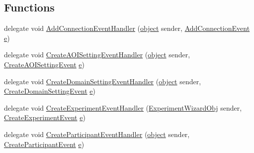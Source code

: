 \subsection*{Functions}
\begin{DoxyCompactItemize}
\item 
delegate void \hyperlink{namespace_web_analyzer_1_1_events_a902fba3fe7d4503704b73171cd38cf68}{Add\+Connection\+Event\+Handler} (\hyperlink{_u_i_2_h_t_m_l_resources_2js_2lib_2underscore_8min_8js_aae18b7515bb2bc4137586506e7c0c903}{object} sender, \hyperlink{class_web_analyzer_1_1_events_1_1_add_connection_event}{Add\+Connection\+Event} \hyperlink{_u_i_2_h_t_m_l_resources_2js_2lib_2bootstrap_8min_8js_ab5902775854a8b8440bcd25e0fe1c120}{e})
\item 
delegate void \hyperlink{namespace_web_analyzer_1_1_events_a1da12d77ad447a64e9f63c4ce04040ff}{Create\+A\+O\+I\+Setting\+Event\+Handler} (\hyperlink{_u_i_2_h_t_m_l_resources_2js_2lib_2underscore_8min_8js_aae18b7515bb2bc4137586506e7c0c903}{object} sender, \hyperlink{class_web_analyzer_1_1_events_1_1_create_a_o_i_setting_event}{Create\+A\+O\+I\+Setting\+Event} \hyperlink{_u_i_2_h_t_m_l_resources_2js_2lib_2bootstrap_8min_8js_ab5902775854a8b8440bcd25e0fe1c120}{e})
\item 
delegate void \hyperlink{namespace_web_analyzer_1_1_events_a51e3882127acccb363a75b247db1d884}{Create\+Domain\+Setting\+Event\+Handler} (\hyperlink{_u_i_2_h_t_m_l_resources_2js_2lib_2underscore_8min_8js_aae18b7515bb2bc4137586506e7c0c903}{object} sender, \hyperlink{class_web_analyzer_1_1_events_1_1_create_domain_setting_event}{Create\+Domain\+Setting\+Event} \hyperlink{_u_i_2_h_t_m_l_resources_2js_2lib_2bootstrap_8min_8js_ab5902775854a8b8440bcd25e0fe1c120}{e})
\item 
delegate void \hyperlink{namespace_web_analyzer_1_1_events_a0d98385fddff10a46e47d4df06513bb1}{Create\+Experiment\+Event\+Handler} (\hyperlink{class_web_analyzer_1_1_u_i_1_1_interaction_objects_1_1_experiment_wizard_obj}{Experiment\+Wizard\+Obj} sender, \hyperlink{class_web_analyzer_1_1_events_1_1_create_experiment_event}{Create\+Experiment\+Event} \hyperlink{_u_i_2_h_t_m_l_resources_2js_2lib_2bootstrap_8min_8js_ab5902775854a8b8440bcd25e0fe1c120}{e})
\item 
delegate void \hyperlink{namespace_web_analyzer_1_1_events_a0c2cd67965a3ab4b60d116945f0c6490}{Create\+Participant\+Event\+Handler} (\hyperlink{_u_i_2_h_t_m_l_resources_2js_2lib_2underscore_8min_8js_aae18b7515bb2bc4137586506e7c0c903}{object} sender, \hyperlink{class_web_analyzer_1_1_events_1_1_create_participant_event}{Create\+Participant\+Event} \hyperlink{_u_i_2_h_t_m_l_resources_2js_2lib_2bootstrap_8min_8js_ab5902775854a8b8440bcd25e0fe1c120}{e})

\end{DoxyCompactItemize}
